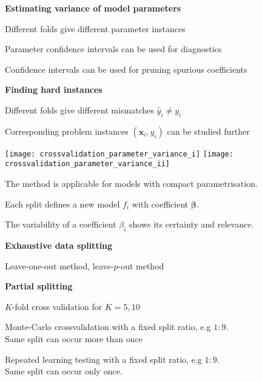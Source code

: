 \documentclass[landscape,footrule]{foils}
\renewcommand{\vec}[1]{\boldsymbol{#1}}
\begin{document}
\textbf{Estimating variance of model parameters}
\begin{triangles}
\item Different folds give different parameter instances
\item Parameter confidence intervals can be used for diagnostics
\item Confidence intervals can be used for pruning spurious coefficients\vspace*{0.5cm}
\end{triangles} 

\textbf{Finding hard instances}
\begin{triangles}
\item Different folds give different mismatches $\hat{y}_i\neq y_i$
\item Corresponding problem instances $(\vec{x}_i, y_i)$ can be studied further
\end{triangles}



\centerline{
\texttt{[image: crossvalidation\_parameter\_variance\_i]}\hspace*{0.5cm}
\texttt{[image: crossvalidation\_parameter\_variance\_ii]}}
\vspace*{-.5cm}
\begin{triangles}
\item The method is applicable for models with compact parametrisation.
\item Each split defines a new model $f_i$ with coefficient $\vec{\beta}$.   
\item The variability of a coefficient $\beta_i$ shows its certainty and relevance. 
\end{triangles}



\textbf{Exhaustive data splitting}
\begin{triangles}
\item Leave-one-out method, leave-$p$-out method
\end{triangles}
\vspace*{1cm}

\textbf{Partial splitting}
\begin{triangles}
\item $K$-fold cross validation for $K = 5 , 10$ 
\item Monte-Carlo crossvalidation with a fixed split ratio, e.g $1:9$.\\ Same split can occur more than once  
\item Repeated learning testing with  a fixed split ratio, e.g $1:9$.
\\ Same split can occur only once. 
\end{triangles}
\end{document}
